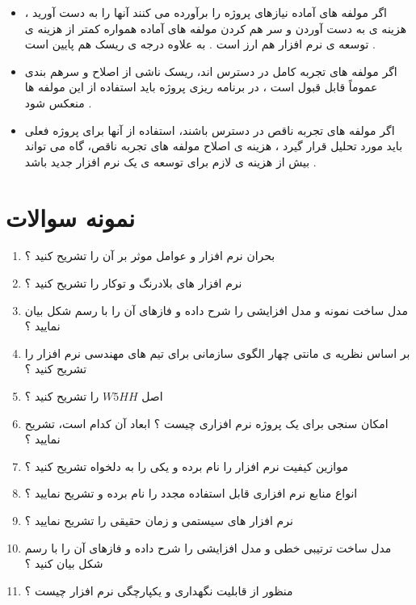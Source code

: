 \documentclass{article}
\begin{document}
\begin{itemize}
	\item اگر مولفه های آماده نیازهای پروژه را برآورده می کنند آنها را به دست آورید ، هزینه ی به دست آوردن و سر هم کردن مولفه های آماده همواره کمتر از هزینه ی توسعه ی نرم افزار هم ارز است . به علاوه درجه ی ریسک هم پایین است .
	\item اگر مولفه های تجربه کامل در دسترس اند، ریسک ناشی از اصلاح و سرهم بندی عموماً قابل قبول است ، در برنامه ریزی پروژه باید استفاده از این مولفه ها منعکس شود .
	\item اگر مولفه های تجربه ناقص در دسترس باشند، استفاده از آنها برای پروژه فعلی باید مورد تحلیل قرار گیرد ، هزینه ی اصلاح مولفه های تجربه ناقص، گاه می تواند بیش از هزینه ی لازم برای توسعه ی یک نرم افزار جدید باشد .
\end{itemize}



\newpage

\section{نمونه سوالات}

\begin{enumerate}
	\item بحران نرم افزار و عوامل موثر بر آن را تشریح کنید ؟
	\item نرم افزار های بلادرنگ و توکار را تشریح کنید ؟
	\item مدل ساخت نمونه و مدل افزایشی را شرح داده و فازهای آن را با رسم شکل بیان نمایید ؟
	\item بر اساس نظریه ی مانتی چهار الگوی سازمانی برای تیم های مهندسی نرم افزار را تشریح کنید ؟
	\item اصل $W5HH$ را تشریح کنید ؟
	\item امکان سنجی برای یک پروژه نرم افزاری چیست ؟ ابعاد آن کدام است، تشریح نمایید ؟
	\item موازین کیفیت نرم افزار را نام برده و یکی را به دلخواه تشریح کنید ؟
	\item انواع منابع نرم افزاری قابل استفاده مجدد را نام برده و تشریح نمایید ؟
	\item نرم افزار های سیستمی و زمان حقیقی را تشریح نمایید ؟
	\item مدل ساخت ترتیبی خطی و مدل افزایشی را شرح داده و فازهای آن را با رسم شکل بیان کنید ؟
	\item منظور از قابلیت نگهداری و یکپارچگی نرم افزار چیست ؟ 
\end{enumerate}
\end{document}
